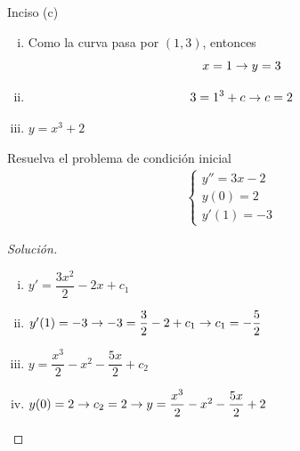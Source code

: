 {Inciso (c)}
\begin{enumerate}[(i)]
	\item Como la curva pasa por $(1,3)$, entonces
	$$x=1 \rightarrow y =3$$
	\item $$
	3 = 1^{3}+c \rightarrow c=2
	$$
	\item $y=x^{3}+2$
\end{enumerate}


\begin{resuelto}
	Resuelva el problema de condición inicial
	\begin{align*}
		\begin{cases}
			y''=3x-2\\
			y(0)=2\\
			y'(1)=-3
		\end{cases}
	\end{align*}
\end{resuelto}


\begin{proof}[Solución]
	\begin{enumerate}[(i)]
		\item $y'=\dfrac{3x^{2}}{2}-2x+c_{1}$
		\item $y'(1)=-3\rightarrow
		-3=\dfrac{3}{2}-2+c_{1} \rightarrow
		c_{1}=-\dfrac{5}{2}$
		\item $y= \dfrac{x^{3}}{2}-x^{2}-\dfrac{5x}{2}+c_2$
		\item
		$y(0)=2\rightarrow
		c_{2}=2 \rightarrow
		y = \dfrac{x^{3}}{2}-x^{2}-\dfrac{5x}{2}+2$
	\end{enumerate}
\end{proof}


